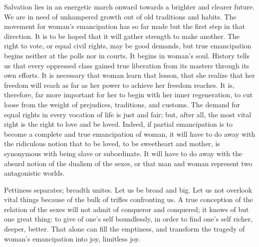 Salvation lies in an energetic march onward towards a brighter and
clearer future. We are in need of unhampered growth out of old
traditions and habits. The movement for woman's emancipation has so
far made but the first step in that direction. It is to be hoped that
it will gather strength to make another. The right to vote, or equal
civil rights, may be good demands, but true emancipation begins
neither at the polls nor in courts. It begins in woman's soul. History
tells us that every oppressed class gained true liberation from its
masters through its own efforts. It is necessary that woman learn that
lesson, that she realize that her freedom will reach as far as her
power to achieve her freedom reaches. It is, therefore, far more
important for her to begin with her inner regeneration, to cut loose
from the weight of prejudices, traditions, and customs. The demand for
equal rights in every vocation of life is just and fair; but, after
all, the most vital right is the right to love and be loved. Indeed,
if partial emancipation is to become a complete and true emancipation
of woman, it will have to do away with the ridiculous notion that to
be loved, to be sweetheart and mother, is synonymous with being slave
or subordinate. It will have to do away with the absurd 
notion of the dualism of the sexes, or that man and woman represent
two antagonistic worlds.

Pettiness separates; breadth unites. Let us be broad and big. Let us
not overlook vital things because of the bulk of trifles confronting
us. A true conception of the relation of the sexes will not admit of
conqueror and conquered; it knows of but one great thing: to give of
one's self boundlessly, in order to find one's self richer, deeper,
better. That alone can fill the emptiness, and transform the tragedy
of woman's emancipation into joy, limitless joy.


